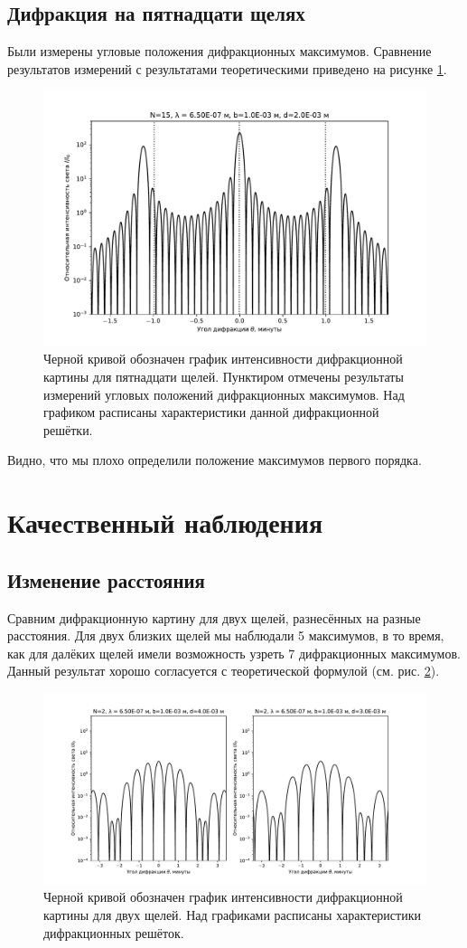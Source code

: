 \documentclass[12pt]{article}
\begin{document}
	\subsection{Дифракция на пятнадцати щелях}
	Были измерены угловые положения дифракционных максимумов. Сравнение результатов измерений с результатами теоретическими приведено на рисунке \ref{fig:figure4}.
	\begin{figure}[ht]
		\centering
		\includegraphics[width=0.7\linewidth]{../plots/dif_15}
		\caption{Черной кривой обозначен график интенсивности дифракционной картины для пятнадцати щелей. Пунктиром отмечены результаты измерений угловых положений дифракционных максимумов. Над графиком расписаны характеристики данной дифракционной решётки.}
		\label{fig:figure4}
	\end{figure}
	Видно, что мы плохо определили положение максимумов первого порядка.

	\section{Качественный наблюдения}
	\subsection{Изменение расстояния}
	Сравним дифракционную картину для двух щелей, разнесённых на разные расстояния. Для двух близких щелей мы наблюдали 5 максимумов, в то время, как для далёких щелей имели возможность узреть 7 дифракционных максимумов. Данный результат хорошо согласуется с теоретической формулой (см. рис. \ref{fig:figure5}).
	\begin{figure}[ht]
		\centering
		\includegraphics[width=0.7\linewidth]{../plots/dif_2_compar_d}
		\caption{Черной кривой обозначен график интенсивности дифракционной картины для двух щелей. Над графиками расписаны характеристики дифракционных решёток.}
		\label{fig:figure5}
	\end{figure}
\end{document}
